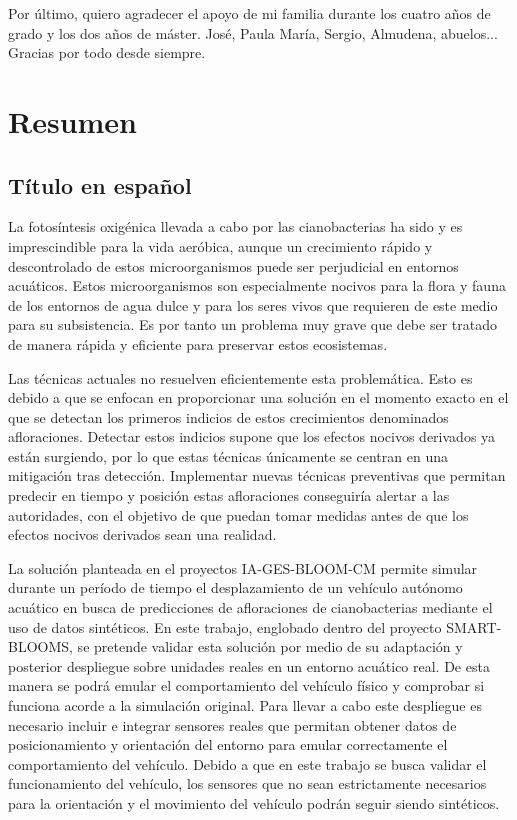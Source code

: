 \documentclass[11pt,a4paper]{book}
\begin{document}
Por último, quiero agradecer el apoyo de mi familia durante los cuatro años de grado y los dos años de máster. José, Paula María, Sergio, Almudena, abuelos... Gracias por todo desde siempre.

\cleardoublepage
\chapter*{Resumen}
\section*{Título en español}
La fotosíntesis oxigénica llevada a cabo por las cianobacterias ha sido y es imprescindible para la vida aeróbica, aunque un crecimiento rápido y descontrolado de estos microorganismos puede ser perjudicial en entornos acuáticos. Estos microorganismos son especialmente nocivos para la flora y fauna de los entornos de agua dulce y para los seres vivos que requieren de este medio para su subsistencia. Es por tanto un problema muy grave que debe ser tratado de manera rápida y eficiente para preservar estos ecosistemas.

Las técnicas actuales no resuelven eficientemente esta problemática. Esto es debido a que se enfocan en proporcionar una solución en el momento exacto en el que se detectan los primeros indicios de estos crecimientos denominados afloraciones. Detectar estos indicios supone que los efectos nocivos derivados ya están surgiendo, por lo que estas técnicas únicamente se centran en una mitigación tras detección. Implementar nuevas técnicas preventivas que permitan predecir en tiempo y posición estas afloraciones conseguiría alertar a las autoridades, con el objetivo de que puedan tomar medidas antes de que los efectos nocivos derivados sean una realidad.

La solución planteada en el proyectos IA-GES-BLOOM-CM permite simular durante un período de tiempo el desplazamiento de un vehículo autónomo acuático en busca de predicciones de afloraciones de cianobacterias mediante el uso de datos sintéticos. En este trabajo, englobado dentro del proyecto SMART-BLOOMS, se pretende validar esta solución por medio de su adaptación y posterior despliegue sobre unidades reales en un entorno acuático real. De esta manera se podrá emular el comportamiento del vehículo físico y comprobar si funciona acorde a la simulación original. Para llevar a cabo este despliegue es necesario incluir e integrar sensores reales que permitan obtener datos de posicionamiento y orientación del entorno para emular correctamente el comportamiento del vehículo. Debido a que en este trabajo se busca validar el funcionamiento del vehículo, los sensores que no sean estrictamente necesarios para la orientación y el movimiento del vehículo podrán seguir siendo sintéticos.
\end{document}
